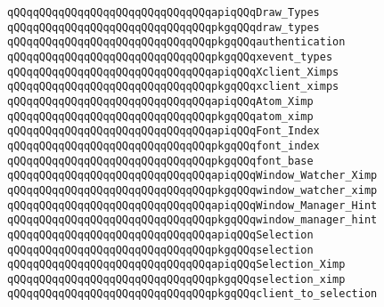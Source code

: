 \verb|qQQqqQQqqQQqqQQqqQQqqQQqqQQqqQQqapiqQQqDraw_Types|\newline
\verb|qQQqqQQqqQQqqQQqqQQqqQQqqQQqqQQqpkgqQQqdraw_types|\newline
\newline
\verb|qQQqqQQqqQQqqQQqqQQqqQQqqQQqqQQqpkgqQQqauthentication|\newline
\verb|qQQqqQQqqQQqqQQqqQQqqQQqqQQqqQQqpkgqQQqxevent_types|\newline
\newline
\verb|qQQqqQQqqQQqqQQqqQQqqQQqqQQqqQQqapiqQQqXclient_Ximps|\newline
\verb|qQQqqQQqqQQqqQQqqQQqqQQqqQQqqQQqpkgqQQqxclient_ximps|\newline
\newline
\verb|qQQqqQQqqQQqqQQqqQQqqQQqqQQqqQQqapiqQQqAtom_Ximp|\newline
\verb|qQQqqQQqqQQqqQQqqQQqqQQqqQQqqQQqpkgqQQqatom_ximp|\newline
\newline
\verb|qQQqqQQqqQQqqQQqqQQqqQQqqQQqqQQqapiqQQqFont_Index|\newline
\verb|qQQqqQQqqQQqqQQqqQQqqQQqqQQqqQQqpkgqQQqfont_index|\newline
\newline
\verb|qQQqqQQqqQQqqQQqqQQqqQQqqQQqqQQqpkgqQQqfont_base|\newline
\newline
\verb|qQQqqQQqqQQqqQQqqQQqqQQqqQQqqQQqapiqQQqWindow_Watcher_Ximp|\newline
\verb|qQQqqQQqqQQqqQQqqQQqqQQqqQQqqQQqpkgqQQqwindow_watcher_ximp|\newline
\newline
\verb|qQQqqQQqqQQqqQQqqQQqqQQqqQQqqQQqapiqQQqWindow_Manager_Hint|\newline
\verb|qQQqqQQqqQQqqQQqqQQqqQQqqQQqqQQqpkgqQQqwindow_manager_hint|\newline
\newline
\verb|qQQqqQQqqQQqqQQqqQQqqQQqqQQqqQQqapiqQQqSelection|\newline
\verb|qQQqqQQqqQQqqQQqqQQqqQQqqQQqqQQqpkgqQQqselection|\newline
\newline
\verb|qQQqqQQqqQQqqQQqqQQqqQQqqQQqqQQqapiqQQqSelection_Ximp|\newline
\verb|qQQqqQQqqQQqqQQqqQQqqQQqqQQqqQQqpkgqQQqselection_ximp|\newline
\verb|qQQqqQQqqQQqqQQqqQQqqQQqqQQqqQQqpkgqQQqclient_to_selection|\newline
